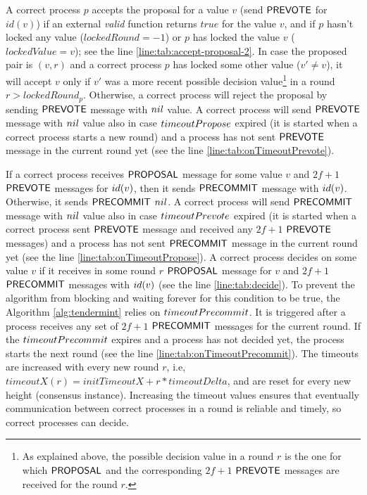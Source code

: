 A correct process $p$ accepts the proposal for a value $v$  (send $\mathsf{PREVOTE}$ for $id(v)$) if an external \emph{valid} function returns $true$ for the value $v$,
and if $p$ hasn't locked any value ($lockedRound = -1$) or $p$ has locked the value $v$ ($lockedValue = v$); see the line \ref{line:tab:accept-proposal-2}. 
In case the proposed pair is $(v,r)$ and a correct process $p$ has locked some other value ($v' \neq v$), it will accept $v$ only if $v'$ was a more recent possible decision value\footnote{As explained above, the possible decision value in a round $r$ is the one for which $\mathsf{PROPOSAL}$ and the corresponding $2f+1$ $\mathsf{PREVOTE}$ messages are received for the round $r$.} in a round $r > lockedRound_p$.
Otherwise, a correct process will reject the proposal by sending $\mathsf{PREVOTE}$ message with $nil$ value. A correct process will send $\mathsf{PREVOTE}$ message with $nil$ value also in case $timeoutPropose$ expired (it is started when a correct process starts a new round) and a process has not sent $\mathsf{PREVOTE}$ message in the current round yet (see the line \ref{line:tab:onTimeoutPrevote}). 

If a correct process receives $\mathsf{PROPOSAL}$ message for some value $v$ and $2f+1$ $\mathsf{PREVOTE}$
messages for $id(v)$, then it sends $\mathsf{PRECOMMIT}$ message with $id(v)$. Otherwise, it sends $\mathsf{PRECOMMIT}$ $nil$. A correct process will send $\mathsf{PRECOMMIT}$ message with $nil$ value also in case $timeoutPrevote$ expired (it is started when a correct process sent $\mathsf{PREVOTE}$ message and received any $2f+1$ $\mathsf{PREVOTE}$ messages)  and a process has not sent $\mathsf{PRECOMMIT}$ message in the current round yet (see the line \ref{line:tab:onTimeoutPropose}). 
A correct process decides on some value $v$ if it receives in some round $r$ $\mathsf{PROPOSAL}$ message for $v$ and $2f+1$ $\mathsf{PRECOMMIT}$ messages with $id(v)$ (see the line \ref{line:tab:decide}).  
To prevent the algorithm from blocking and waiting forever for this condition to be true, the Algorithm \ref{alg:tendermint} relies on $timeoutPrecommit$. It is triggered after a process receives any set of $2f+1$ $\mathsf{PRECOMMIT}$ messages for the current round. If the $timeoutPrecommit$ expires and a process has not decided yet, the process starts the next round (see the line \ref{line:tab:onTimeoutPrecommit}).  
The timeouts are increased with every new round $r$, i.e, $timeoutX(r) = initTimeoutX + r*timeoutDelta$, and are reset for every new height (consensus instance). Increasing the timeout values ensures that eventually communication between correct processes in a round is reliable and timely, so correct processes can decide. 

